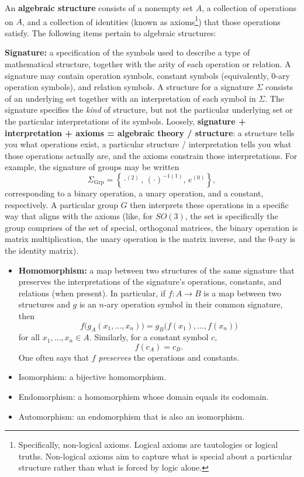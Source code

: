 An \textbf{algebraic structure} consists of a nonempty set $A$, a collection of operations on $A$, and a collection of identities (known as axioms\footnote{Specifically, non-logical axioms. Logical axioms are tautologies or logical truths. Non-logical axioms aim to capture what is special about a particular structure rather than what is forced by logic alone.}) that those operations satisfy. The following items pertain to algebraic structures:

\textbf{Signature:} a specification of the symbols used to describe a type of mathematical structure, together with the arity of each operation or relation. A signature may contain operation symbols, constant symbols (equivalently, $0$-ary operation symbols), and relation symbols. A structure for a signature $\Sigma$ consists of an underlying set together with an interpretation of each symbol in $\Sigma$. The signature specifies the \emph{kind} of structure, but not the particular underlying set or the particular interpretations of its symbols. Loosely, \textbf{signature + interpretation + axioms = algebraic theory / structure}: a structure tells you what operations exist, a particular structure / interpretation tells you what those operations actually are, and the axioms constrain those interpretations. For example, the signature of groups may be written
\[
    \Sigma_{\mathrm{Grp}}
    =
    \left\{
        \cdot^{(2)},\,
        (\cdot)^{-1(1)},\,
        e^{(0)}
    \right\},
\]
corresponding to a binary operation, a unary operation, and a constant, respectively. A particular group $G$ then interprets these operations in a specific way that aligns with the axioms (like, for $SO(3)$, the set is specifically the group comprises of the set of special, orthogonal matrices, the binary operation is matrix multiplication, the unary operation is the matrix inverse, and the 0-ary is the identity matrix).
\begin{itemize}
    \item \textbf{Homomorphism:} a map between two structures of the same signature that preserves the interpretations of the signature's operations, constants, and relations (when present). In particular, if $f:A\rightarrow B$ is a map between two structures and $g$ is an $n$-ary operation symbol in their common signature, then
    \[
        f\bigl(g_A(x_1,\ldots,x_n)\bigr)
        =
        g_B\bigl(f(x_1),\ldots,f(x_n)\bigr)
    \]
    for all $x_1,\ldots,x_n\in A$. Similarly, for a constant symbol $c$,
    \[
        f(c_A)=c_B.
    \]
    One often says that $f$ \emph{preserves} the operations and constants.
    \item Isomorphism: a bijective homomorphism.
    \item Endomorphism: a homomorphism whose domain equals its codomain.
    \item Automorphism: an endomorphism that is also an isomorphism.
\end{itemize}
